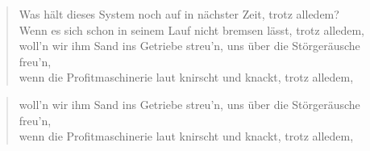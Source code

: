 \documentclass[9pt,a4paper,oneside, onecolumn]{article}
\begin{document}
\begin{verse}
Was \C{}hält dieses Sys\Dm{}tem noch auf in nächster Zeit, trotz \Am{}alledem?\\
Wenn \C{}es sich schon in \Dm{}seinem Lauf nicht bremsen lässt, trotz alledem,\\
woll'n wir \C{}ihm Sand ins Getriebe streu'n, uns ü\C{}ber die Störgeräusche freu'n,\\
wenn die Profitma\Dm{}schinerie laut knirscht und knackt, trotz alledem,\\
\end{verse}

\begin{verse}
woll'n wir \C{}ihm Sand ins Getriebe streu'n, uns ü\C{}ber die Störgeräusche freu'n,\\
wenn die Profitma\Dm{}schinerie laut knirscht und knackt, trotz alledem,\\
\end{verse}
\end{document}
